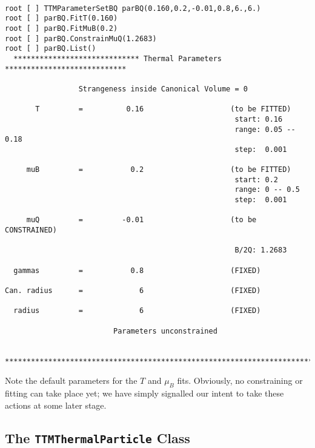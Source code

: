\documentclass{elsarticle}
\begin{document}
\small
\begin{verbatim}

root [ ] TTMParameterSetBQ parBQ(0.160,0.2,-0.01,0.8,6.,6.)
root [ ] parBQ.FitT(0.160)
root [ ] parBQ.FitMuB(0.2)
root [ ] parBQ.ConstrainMuQ(1.2683)
root [ ] parBQ.List()
  ***************************** Thermal Parameters ****************************

                 Strangeness inside Canonical Volume = 0

       T         =          0.16                    (to be FITTED)
                                                     start: 0.16
                                                     range: 0.05 -- 0.18
                                                     step:  0.001

     muB         =           0.2                    (to be FITTED)
                                                     start: 0.2
                                                     range: 0 -- 0.5
                                                     step:  0.001

     muQ         =         -0.01                    (to be CONSTRAINED)

                                                     B/2Q: 1.2683

  gammas         =           0.8                    (FIXED)

Can. radius      =             6                    (FIXED)

  radius         =             6                    (FIXED)

                         Parameters unconstrained

  ******************************************************************************

\end{verbatim}
\normalsize

\noindent
Note the default parameters for the $T$ and $\mu_B$ fits. Obviously, no constraining or fitting can 
take place yet; we have simply signalled our intent to take these actions at some later stage.

\subsection{The \texttt{TTMThermalParticle} Class}
\end{document}
